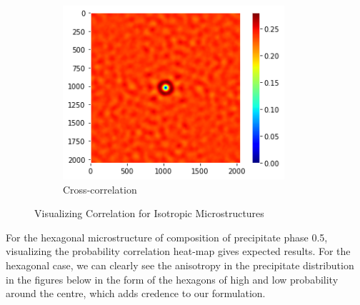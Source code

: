 \documentclass[12pt, a4paper]{report}
\begin{document}
\begin{figure}[H]
\begin{subfigure}{.32\textwidth}
  \centering
  \includegraphics[width=0.9\textwidth]{Pictures/MSFeatures/CorrImageCross.png}
  \caption{Cross-correlation}
  \label{img:microstrImg}
\end{subfigure}
\caption{Visualizing Correlation for Isotropic Microstructures}
\label{fig:test}
\end{figure}

For the hexagonal microstructure of composition of precipitate phase 0.5, visualizing the probability correlation heat-map gives expected results. For the hexagonal case, we can clearly see the anisotropy in the precipitate distribution in the figures below in the form of the hexagons of high and low probability around the centre, which adds credence to our formulation. 
\end{document}
